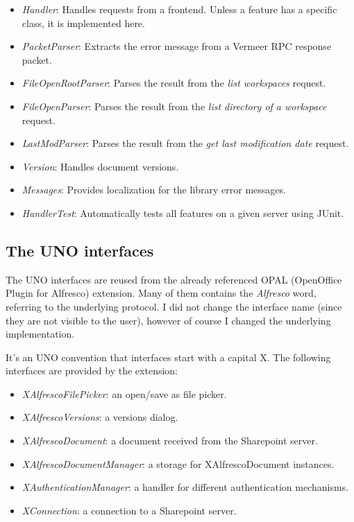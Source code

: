 \begin{itemize}
\item \emph{Handler}: Handles requests from a frontend. Unless a feature has a
specific class, it is implemented here.
\item \emph{PacketParser}: Extracts the error message from a Vermeer
RPC\cite{vermeer} response packet.
\item \emph{FileOpenRootParser}: Parses the result from the \emph{list
workspaces} request.
\item \emph{FileOpenParser}: Parses the result from the \emph{list directory of
a workspace} request.
\item \emph{LastModParser}: Parses the result from the \emph{get last
modification date} request.
\item \emph{Version}: Handles document versions.
\item \emph{Messages}: Provides localization for the library error messages.
\item \emph{HandlerTest}: Automatically tests all features on a given server
using JUnit.
\end{itemize}

\subsection{The UNO interfaces}

The UNO interfaces are reused from the already referenced OPAL (OpenOffice
Plugin for Alfresco) extension. Many of them contains the \emph{Alfresco} word,
referring to the underlying protocol. I did not change the interface name
(since they are not visible to the user), however of course I changed the
underlying implementation.

It's an UNO convention that interfaces start with a capital X. The following
interfaces are provided by the extension:

\begin{itemize}
\item \emph{XAlfrescoFilePicker}: an open/save as file picker.
\item \emph{XAlfrescoVersions}: a versions dialog.
\item \emph{XAlfrescoDocument}: a document received from the
Sharepoint server.
\item \emph{XAlfrescoDocumentManager}: a storage for XAlfrescoDocument instances.
\item \emph{XAuthenticationManager}: a handler for different authentication mechanisms.
\item \emph{XConnection}: a connection to a Sharepoint server.
\end{itemize}

